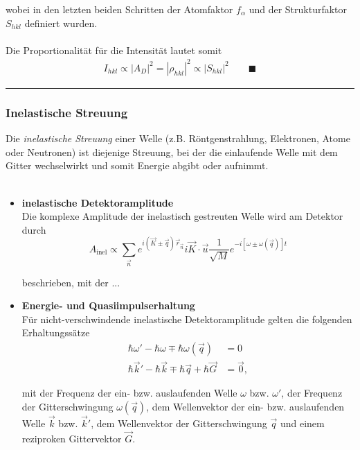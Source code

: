 \documentclass{article}
\newcommand{\lreck}[1]{\left[#1\right]}
\begin{document}
{	wobei in den letzten beiden Schritten der Atomfaktor $f_\alpha$ und der Strukturfaktor $S_{hkl}$ definiert wurden.\\
	\\
	Die Proportionalität für die Intensität lautet somit
		\begin{align*}
			I_{hkl} \propto |A_D|^2 = |\rho_{hkl}|^2 \propto |S_{hkl}|^2 \qquad \blacksquare
		\end{align*}
\hrule
}


\newpage


\subsubsection{Inelastische Streuung}
Die \textit{inelastische Streuung} einer Welle (z.B. Röntgenstrahlung, Elektronen, Atome oder Neutronen) ist diejenige Streuung, bei der die einlaufende Welle mit dem Gitter wechselwirkt und somit Energie abgibt oder aufnimmt.\\\\
	\begin{itemize}
		\item \textbf{inelastische Detektoramplitude}\\
		Die komplexe Amplitude der inelastisch gestreuten Welle wird am Detektor durch
			\begin{equation}
				A_\text{inel} \propto \sum_{\vec{n}} e^{i ( \vec{K} \pm \vec{q}) \vec{r}_{\vec{n}}} i \vec{K} \cdot \vec{u} \frac{1}{\sqrt{M}} e^{-i \lreck{ \omega \pm \omega(\vec{q}) } t}
			\end{equation}
		
		beschrieben, mit der ...
		
		
		\item \textbf{Energie- und Quasiimpulserhaltung}\\
		Für nicht-verschwindende inelastische Detektoramplitude gelten die folgenden Erhaltungssätze
			\begin{align}
				\hbar \omega' - \hbar \omega \mp \hbar \omega(\vec{q}) &= 0 \\
				\hbar \vec{k}' - \hbar \vec{k} \mp \hbar \vec{q} + \hbar \vec{G} &= \vec{0},
			\end{align}
		
		mit der Frequenz der ein- bzw. auslaufenden Welle $\omega$ bzw. $\omega'$, der Frequenz der Gitterschwingung $\omega(\vec{q})$, dem Wellenvektor der ein- bzw. auslaufenden Welle $\vec{k}$ bzw. $\vec{k}'$, dem Wellenvektor der Gitterschwingung $\vec{q}$ und einem reziproken Gittervektor $\vec{G}$.
	\end{itemize}
\end{document}
